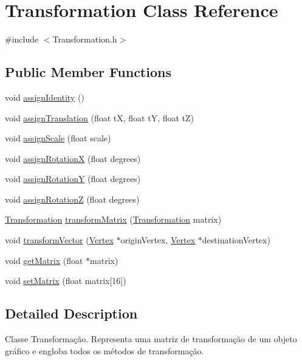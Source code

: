 \hypertarget{class_transformation}{}\section{Transformation Class Reference}
\label{class_transformation}


{\ttfamily \#include $<$Transformation.\+h$>$}

\subsection*{Public Member Functions}
\begin{DoxyCompactItemize}
\item 
void \hyperlink{class_transformation_ae2ac921bb44c1f907761013ab6dbfc81}{assign\+Identity} ()
\item 
void \hyperlink{class_transformation_ac66fdd4bb9108746ef69948b9a4c74cc}{assign\+Translation} (float t\+X, float t\+Y, float t\+Z)
\item 
void \hyperlink{class_transformation_a2a6f9f707cefb46331091a5543511723}{assign\+Scale} (float scale)
\item 
void \hyperlink{class_transformation_a707222e4e2920066b5aa74ca8f7e4e86}{assign\+Rotation\+X} (float degrees)
\item 
void \hyperlink{class_transformation_af6d79f2ae65e413028668d5931c2911c}{assign\+Rotation\+Y} (float degrees)
\item 
void \hyperlink{class_transformation_ae516d84646e1b76a944b4e089974663d}{assign\+Rotation\+Z} (float degrees)
\item 
\hyperlink{class_transformation}{Transformation} \hyperlink{class_transformation_ae5d163335122285fe6aea22e85a685d4}{transform\+Matrix} (\hyperlink{class_transformation}{Transformation} matrix)
\item 
void \hyperlink{class_transformation_aa5cce34a712e9dd7f46068012c5bd794}{transform\+Vector} (\hyperlink{class_vertex}{Vertex} $\ast$origin\+Vertex, \hyperlink{class_vertex}{Vertex} $\ast$destination\+Vertex)
\item 
void \hyperlink{class_transformation_ae07759ae90a63e999628d5e4113e391f}{get\+Matrix} (float $\ast$matrix)
\item 
void \hyperlink{class_transformation_a3ff52ef74e5f1fc79c7ad82e35d30313}{set\+Matrix} (float matrix\mbox{[}16\mbox{]})
\end{DoxyCompactItemize}


\subsection{Detailed Description}
Classe Transformação. Representa uma matriz de transformação de um objeto gráfico e engloba todos os métodos de transformação. 

